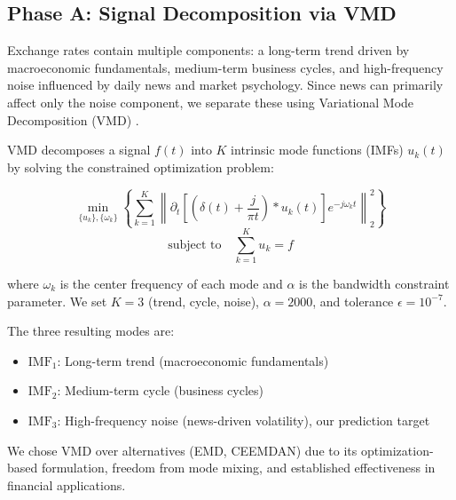 \documentclass[11pt]{article}
\begin{document}
\subsection{Phase A: Signal Decomposition via VMD}

Exchange rates contain multiple components: a long-term trend driven by macroeconomic fundamentals, medium-term business cycles, and high-frequency noise influenced by daily news and market psychology. Since news can primarily affect only the noise component, we separate these using Variational Mode Decomposition (VMD) \citep{dragomiretskiy2014}.

VMD decomposes a signal $f(t)$ into $K$ intrinsic mode functions (IMFs) $u_k(t)$ by solving the constrained optimization problem:

\begin{equation}
\min_{\{u_k\},\{\omega_k\}} \left\{ \sum_{k=1}^{K} \left\| \partial_t \left[ \left( \delta(t) + \frac{j}{\pi t} \right) * u_k(t) \right] e^{-j\omega_k t} \right\|_2^2 \right\}
\end{equation}
\begin{equation}
\text{subject to} \quad \sum_{k=1}^{K} u_k = f
\end{equation}

where $\omega_k$ is the center frequency of each mode and $\alpha$ is the bandwidth constraint parameter. We set $K=3$ (trend, cycle, noise), $\alpha=2000$, and tolerance $\epsilon=10^{-7}$.

The three resulting modes are:
\begin{itemize}
    \item $\text{IMF}_1$: Long-term trend (macroeconomic fundamentals)
    \item $\text{IMF}_2$: Medium-term cycle (business cycles)  
    \item $\text{IMF}_3$: High-frequency noise (news-driven volatility), our prediction target
\end{itemize}

We chose VMD over alternatives (EMD, CEEMDAN) due to its optimization-based formulation, freedom from mode mixing, and established effectiveness in financial applications.
\end{document}
